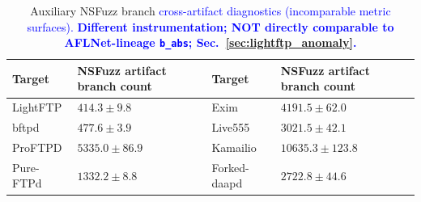 \documentclass[final,5p,times,number]{elsarticle}
\begin{document}
\begin{table}[!t]
\centering
\caption{Auxiliary NSFuzz branch \textcolor{blue}{cross-artifact diagnostics (incomparable metric surfaces). \textbf{Different instrumentation; NOT directly comparable to AFLNet-lineage \texttt{b\_abs}; Sec.~\ref{sec:lightftp_anomaly}.}}}
\vspace{-0.15em}
\label{tab:aux_branch_results}
{\scriptsize
\setlength{\tabcolsep}{6.0pt}
\renewcommand{\arraystretch}{0.95}
\begin{tabularx}{\textwidth}{>{\raggedright\arraybackslash}X
                            >{\centering\arraybackslash}X
                            >{\raggedright\arraybackslash}X
                            >{\centering\arraybackslash}X}
\toprule
Target & NSFuzz artifact branch count & Target & NSFuzz artifact branch count \\
\midrule
LightFTP & $414.3 {\pm} 9.8$ & Exim & $4191.5 {\pm} 62.0$ \\
bftpd & $477.6 {\pm} 3.9$ & Live555 & $3021.5 {\pm} 42.1$ \\
ProFTPD & $5335.0 {\pm} 86.9$ & Kamailio & $10635.3 {\pm} 123.8$ \\
Pure-FTPd & $1332.2 {\pm} 8.8$ & Forked-daapd & $2722.8 {\pm} 44.6$ \\
\bottomrule
\end{tabularx}
}
\end{table}
\end{document}
